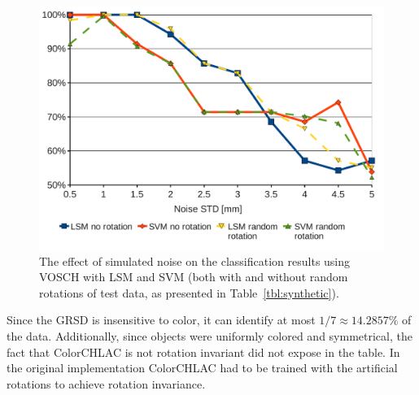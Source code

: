 \documentclass[conference]{sty/IEEEtran}
\begin{document}
\begin{figure}[htb!]
  \begin{center}
    \includegraphics[width=.98\columnwidth]{figures/comparison/vosch.pdf}
    \caption{The effect of simulated noise on the classification results using VOSCH with LSM and SVM
             (both with and without random rotations of test data, as presented in Table~\ref{tbl:synthetic}).}
    \label{fig:plot}
  \end{center}
\end{figure}

Since the GRSD is insensitive to color, it can identify at most $1/7 \approx 14.2857\%$ of the data.
Additionally, since objects were uniformly colored and symmetrical, the fact that ColorCHLAC 
is not rotation invariant did not expose in the table. In the original implementation ColorCHLAC 
had to be trained with the artificial rotations to achieve rotation invariance.
\end{document}
